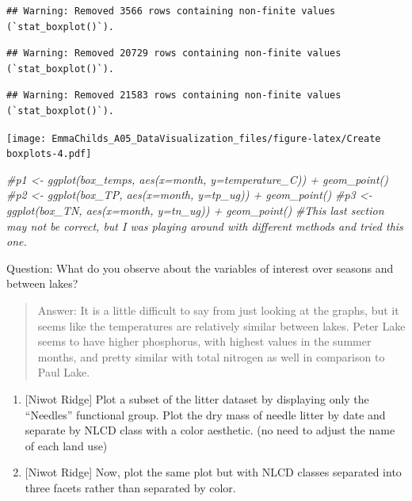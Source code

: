 \documentclass[
]{article}
\newenvironment{Shaded}{\begin{snugshade}}{\end{snugshade}}
\newcommand{\CommentTok}[1]{\textcolor[rgb]{0.56,0.35,0.01}{\textit{#1}}}
\begin{document}
\begin{verbatim}
## Warning: Removed 3566 rows containing non-finite values (`stat_boxplot()`).
\end{verbatim}

\begin{verbatim}
## Warning: Removed 20729 rows containing non-finite values (`stat_boxplot()`).
\end{verbatim}

\begin{verbatim}
## Warning: Removed 21583 rows containing non-finite values (`stat_boxplot()`).
\end{verbatim}

\texttt{[image: EmmaChilds\_A05\_DataVisualization\_files/figure-latex/Create boxplots-4.pdf]}

\begin{Shaded}
\begin{Highlighting}[]
\CommentTok{\#p1 \textless{}{-} ggplot(box\_temps, aes(x=month, y=temperature\_C)) + geom\_point()}
\CommentTok{\#p2 \textless{}{-} ggplot(box\_TP, aes(x=month, y=tp\_ug)) + geom\_point()}
\CommentTok{\#p3 \textless{}{-} ggplot(box\_TN, aes(x=month, y=tn\_ug)) + geom\_point()}
\CommentTok{\#This last section may not be correct, but I was playing around with different methods and tried this one. }
\end{Highlighting}
\end{Shaded}

Question: What do you observe about the variables of interest over
seasons and between lakes?

\begin{quote}
Answer: It is a little difficult to say from just looking at the graphs,
but it seems like the temperatures are relatively similar between lakes.
Peter Lake seems to have higher phosphorus, with highest values in the
summer months, and pretty similar with total nitrogen as well in
comparison to Paul Lake.
\end{quote}

\begin{enumerate}
\def\labelenumi{\arabic{enumi}.}
\setcounter{enumi}{5}
\item
  {[}Niwot Ridge{]} Plot a subset of the litter dataset by displaying
  only the ``Needles'' functional group. Plot the dry mass of needle
  litter by date and separate by NLCD class with a color aesthetic. (no
  need to adjust the name of each land use)
\item
  {[}Niwot Ridge{]} Now, plot the same plot but with NLCD classes
  separated into three facets rather than separated by color.
\end{enumerate}
\end{document}

